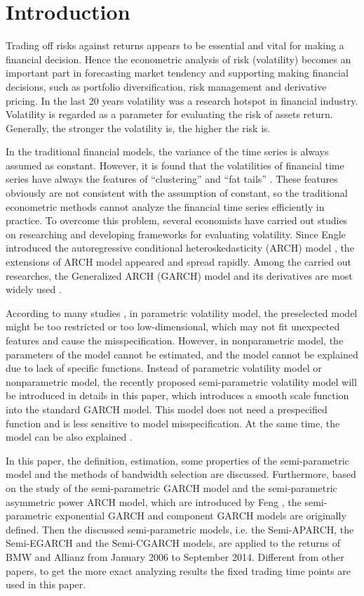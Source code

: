 \chapter{Introduction}\label{secIntroduction}

Trading off risks against returns appears to be essential and vital for making a financial decision. Hence the econometric analysis of risk (volatility) becomes an important part in forecasting market tendency and supporting making financial decisions, such as portfolio diversification, risk management and derivative pricing. In the last 20 years volatility was a research hotspot in financial industry. Volatility is regarded as a parameter for evaluating the risk of assets return. Generally, the stronger the volatility is, the higher the risk is.

In the traditional financial models, the variance of the time series is always assumed as constant. However, it is found that the volatilities of financial time series have always the features of ``clustering'' and ``fat tails'' \citep{Mandelbrot1963, EugeneF.Fama1965}. These features obviously are not consistent with the assumption of constant, so the traditional econometric methods cannot analyze the financial time series efficiently in practice. To overcome this problem, several economists have carried out studies on researching and developing frameworks for evaluating volatility. Since Engle introduced the autoregressive conditional heteroskedasticity (ARCH) model \citep{Engle1982}, the extensions of ARCH model appeared and spread rapidly. Among the carried out researches, the Generalized ARCH (GARCH) model and its derivatives are most widely used \citep{Bollerslev1986}.

 According to many studies \citep{Gourieroux1992,Eubank1993}, in parametric volatility model, the preselected model might be too restricted or too low-dimensional, which may not fit unexpected features and cause the misspecification. However, in nonparametric model, the parameters of the model cannot be estimated, and the model cannot be explained due to lack of specific functions. Instead of parametric volatility model or nonparametric model, the recently proposed semi-parametric volatility model will be introduced in details in this paper, which introduces a smooth scale function into the standard GARCH model. This model does not need a prespecified function and is less sensitive to model misspecification. At the same time, the model can be also explained \citep{Di2011}.

In this paper, the definition, estimation, some properties of the semi-parametric model and the methods of bandwidth selection are discussed. Furthermore, based on the study of the semi-parametric GARCH model and the semi-parametric asymmetric power ARCH model, which are introduced by Feng \citep{Feng2004,FengYuanhua;Sun2013}, the semi-parametric exponential GARCH and component GARCH models are originally defined. Then the discussed semi-parametric models, i.e. the Semi-APARCH, the Semi-EGARCH and the Semi-CGARCH models, are applied to the returns of BMW and Allianz from January 2006 to September 2014. Different from other papers, to get the more exact analyzing results the fixed trading time points are used in this paper.

